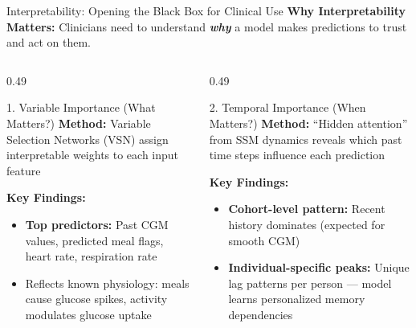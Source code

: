 \documentclass[aspectratio=169,xcolor=dvipsnames]{beamer}
\begin{document}
\begin{frame}{Interpretability: Opening the Black Box for Clinical Use}
    \textbf{Why Interpretability Matters:} Clinicians need to understand \textbf{\textit{why}} a model makes predictions to trust and act on them.
   
  
    \begin{columns}[T]   %
        \begin{column}{0.49\textwidth}
            \begin{block}{1. Variable Importance (What Matters?)}
                \textbf{Method:} Variable Selection Networks (VSN) assign interpretable weights to each input feature
               
                \vspace{0.5em}
                \textbf{Key Findings:}
                \begin{itemize}
                    \item \textbf{Top predictors:} Past CGM values, predicted meal flags, heart rate, respiration rate
                    \item Reflects known physiology: meals cause glucose spikes, activity modulates glucose uptake
                   
                \end{itemize}
            \end{block}
        \end{column}
        \hfill
        \begin{column}{0.49\textwidth}
            \begin{block}{2. Temporal Importance (When Matters?)}
                \textbf{Method:} ``Hidden attention'' from SSM dynamics reveals which past time steps influence each prediction
               
                \vspace{0.5em}   %
                \textbf{Key Findings:}
                \begin{itemize}
                    \item \textbf{Cohort-level pattern:} Recent history dominates (expected for smooth CGM)
                    \item \textbf{Individual-specific peaks:} Unique lag patterns per person — model learns personalized memory dependencies
                 

\end{itemize}
\end{block}
\end{column}
\end{columns}
\end{frame}
\end{document}
